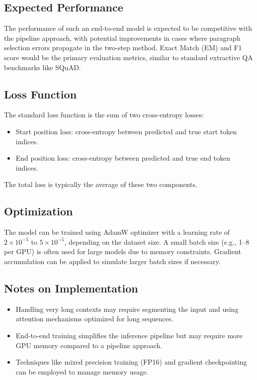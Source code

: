 \documentclass{article}
\begin{document}
\subsection{Expected Performance}
The performance of such an end-to-end model is expected to be competitive with the pipeline approach, with potential improvements in cases where paragraph selection errors propagate in the two-step method. Exact Match (EM) and F1 score would be the primary evaluation metrics, similar to standard extractive QA benchmarks like SQuAD.

\subsection{Loss Function}
The standard loss function is the sum of two cross-entropy losses:
\begin{itemize}
    \item Start position loss: cross-entropy between predicted and true start token indices.
    \item End position loss: cross-entropy between predicted and true end token indices.
\end{itemize}
The total loss is typically the average of these two components.

\subsection{Optimization}
The model can be trained using AdamW optimizer with a learning rate of $2\times 10^{-5}$ to $5\times 10^{-5}$, depending on the dataset size. A small batch size (e.g., 1--8 per GPU) is often used for large models due to memory constraints. Gradient accumulation can be applied to simulate larger batch sizes if necessary.

\subsection{Notes on Implementation}
\begin{itemize}
    \item Handling very long contexts may require segmenting the input and using attention mechanisms optimized for long sequences.
    \item End-to-end training simplifies the inference pipeline but may require more GPU memory compared to a pipeline approach.
    \item Techniques like mixed precision training (FP16) and gradient checkpointing can be employed to manage memory usage.
\end{itemize}
\end{document}
